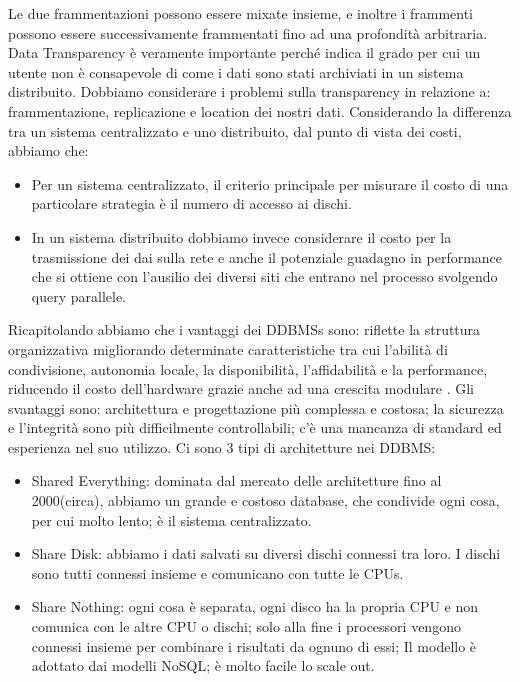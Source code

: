 \documentclass[a4page, 11pt]{article}
\begin{document}
Le due frammentazioni possono essere mixate insieme, e inoltre i frammenti possono essere successivamente frammentati fino ad una profondità arbitraria. 
Data Transparency è veramente importante perché indica il grado per cui un utente non è consapevole di come i dati sono stati archiviati in un sistema distribuito. Dobbiamo considerare i problemi sulla transparency in relazione a: frammentazione, replicazione e location dei nostri dati.
\newline
Considerando la differenza tra un sistema centralizzato e uno distribuito, dal punto di vista dei costi, abbiamo che:
\begin{itemize}[noitemsep]
\item Per un sistema centralizzato, il criterio principale per misurare il costo di una particolare strategia è il numero di accesso ai dischi.
\item In un sistema distribuito dobbiamo invece considerare il costo per la trasmissione dei dai sulla rete  e anche il potenziale guadagno in performance che si ottiene con l'ausilio dei diversi siti che entrano nel processo svolgendo query parallele.
\end{itemize}
Ricapitolando abbiamo che i vantaggi dei DDBMSs sono: riflette la struttura organizzativa migliorando determinate caratteristiche tra cui l'abilità di condivisione, autonomia locale, la disponibilità, l'affidabilità e la performance, riducendo il costo dell'hardware grazie anche ad una crescita modulare .
Gli svantaggi sono: architettura e progettazione più complessa e costosa; la sicurezza e l'integrità sono più difficilmente controllabili; c'è una mancanza di standard ed esperienza nel suo utilizzo.
\newline
Ci sono 3 tipi di architetture nei DDBMS:
\begin{itemize}
\item Shared Everything: dominata dal mercato delle architetture fino al 2000(circa), abbiamo un grande e costoso database, che condivide ogni cosa, per cui molto lento; è il sistema centralizzato.

\item Share Disk: abbiamo i dati salvati su diversi dischi connessi tra loro. I dischi sono tutti connessi insieme e comunicano con tutte le CPUs.

\item Share Nothing: ogni cosa è separata, ogni disco ha la propria CPU e non comunica con le altre CPU o dischi; solo alla fine i processori vengono connessi insieme per combinare i risultati da ognuno di essi; Il modello è adottato dai modelli NoSQL; è molto facile lo scale out. 
\end{itemize}
\end{document}
